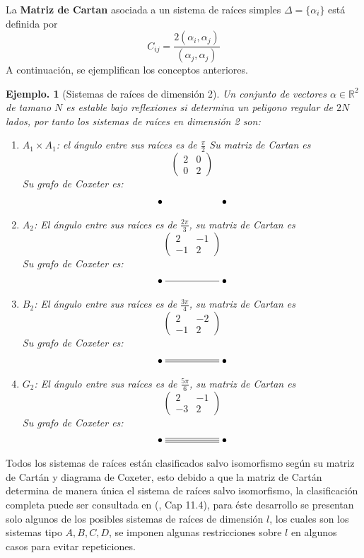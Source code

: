 \documentclass[11pt,a4paper]{article}
\newtheorem{example}{Ejemplo.}
\begin{document}
La \textbf{Matriz de Cartan } asociada a un sistema de raíces simples  $\Delta=\{\alpha_i\}$ está definida por
$$C_{ij}=\frac{2(\alpha_i, \alpha_j)}{(\alpha_j, \alpha_j)} $$
A continuación, se ejemplifican los conceptos anteriores.
\begin{example}[Sistemas de raíces de dimensión 2]
Un conjunto de vectores  $\alpha\in \mathbb{R}^2$ de tamano $N$ es estable bajo reflexiones si determina un peligono regular de $2N$ lados, por tanto los sistemas de raíces en dimensión 2 son:
\begin{enumerate}
    \item  $A_1\times A_1$: el ángulo entre sus raíces es de $\frac{\pi}{2}$ Su matriz de Cartan es 
    $$\begin{pmatrix}  2 & 0 \\
    0 & 2\end{pmatrix} $$
    Su grafo de Coxeter es:
   $$\xymatrix{ \bullet\ar@{}[rr]     && \bullet}$$

    \item $A_2$: El ángulo entre sus raíces es de $\frac{2\pi}{3}$, su matriz de Cartan es
    $$\begin{pmatrix}  2 & -1 \\
    -1 & 2\end{pmatrix} $$
    Su grafo de Coxeter es:
   $$\xymatrix{ \bullet\ar@{-}[rr]     && \bullet}$$
    \item $B_2$: El ángulo entre sus raíces es de $\frac{3\pi}{4}$, su matriz de Cartan es 
     $$\begin{pmatrix}  2 & -2 \\
    -1 & 2\end{pmatrix} $$
    Su grafo de Coxeter es:
   $$\xymatrix{ \bullet\ar@{=}[rr]     && \bullet}$$
    \item $G_2$: El ángulo entre sus raíces es de $\frac{5\pi}{6}$, su matriz de Cartan es
    $$\begin{pmatrix}  2 & -1 \\
    -3 & 2\end{pmatrix} $$
    Su grafo de Coxeter es:
   $$\xymatrix{ \bullet\ar@3{-}[rr]    && \bullet}$$
    
\end{enumerate}

\end{example}
Todos los sistemas de raíces están clasificados salvo isomorfismo según su matriz de Cartán y diagrama de Coxeter, esto debido a que la matriz de Cartán determina de manera única el sistema de raíces salvo isomorfismo, la clasificación completa puede ser consultada en (\cite{humphreys2012introduction}, Cap 11.4), para éste desarrollo se presentan solo algunos de los posibles sistemas de raíces de dimensión $l$, los cuales son los sistemas tipo $A,B,C,D$, se imponen algunas restricciones sobre $l$ en algunos casos para evitar repeticiones. 
\end{document}
